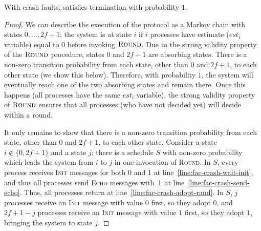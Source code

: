 \begin{theorem}\label{lem:termination-crash}
    With crash faults,  satisfies termination with probability $1$.
\end{theorem}
\begin{proof}
    We can describe the execution of the protocol as a Markov chain with states $0,\ldots,2f+1$; the system is at state $i$ if $i$ processes have estimate ($est_i$ variable) equal to $0$ before invoking $\textsc{Round}$. Due to the strong validity property of the $\textsc{Round}$ procedure, states $0$ and $2f+1$ are absorbing states. There is a non-zero transition probability from each state, other than $0$ and $2f+1$, to each other state (we show this below). Therefore, with probability $1$, the system will eventually reach one of the two absorbing states and remain there. Once this happens (all processes have the same $est_i$ variable), the strong validity property of $\textsc{Round}$ ensures that all processes (who have not decided yet) will decide within a round.
    
    It only remains to show that there is a non-zero transition probability from each state, other than $0$ and $2f+1$, to each other state. Consider a state $i \notin \{0,2f+1\}$ and a state $j$; there is a schedule $S$ with non-zero probability which leads the system from $i$ to $j$ in one invocation of \textsc{Round}. In $S$, every process receives \textsc{Init} messages for both $0$ and $1$ at line~\ref{line:fac-crash-wait-init}, and thus all processes send \textsc{Echo} messages with $\bot$ at line~\ref{line:fac-crash-send-echo}. Thus, all processes return at line~\ref{line:fac-crash-adopt-rand}. In $S$, $j$ processes receive an \textsc{Init} message with value $0$ first, so they adopt $0$, and $2f+1-j$ processes receive an \textsc{Init} message with value $1$ first, so they adopt $1$, bringing the system to state $j$.


    
    
\end{proof}